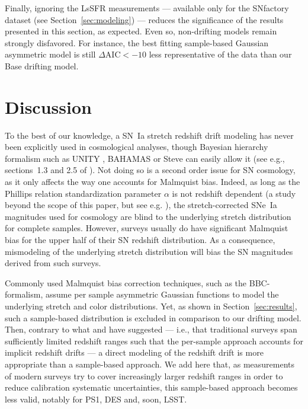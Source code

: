 \documentclass[]{aa}
\begin{document}
Finally, ignoring the LsSFR measurements --- available only for the SNfactory
dataset (see Section~\ref{sec:modeling}) --- reduces the significance of the
results presented in this section, as expected. Even so, non-drifting
models remain strongly disfavored. For instance, the best
fitting sample-based Gaussian asymmetric model is still
$\Delta\mathrm{AIC}<-10$ less representative of the data than our Base drifting
model.

\section{Discussion}\label{sec:discussion}

To the best of our knowledge, a SN~Ia stretch redshift drift modeling has never
been explicitly used in cosmological analyses, though Bayesian hierarchy
formalism such as UNITY \citep{rubin2015}, BAHAMAS \citep{shariff2016} or Steve
\citep{hinton2019} can easily allow it (see e.g., sections~1.3 and 2.5 of
\cite{rubin2015}). Not doing so is a second order issue for SN cosmology, as it
only affects the way one accounts for Malmquist bias. Indeed, as long as the
Phillips relation \citep{phillips1993} standardization parameter $\alpha$ is not
redshift dependent (a study beyond the scope of this paper, but see
e.g. \citealt{scolnic2018a}), the stretch-corrected SNe~Ia magnitudes used for
cosmology are blind to the underlying stretch distribution for complete samples.
However, surveys usually do have significant Malmquist bias for the upper half
of their SN redshift distribution. As a consequence, mismodeling of the
underlying stretch distribution will bias the SN magnitudes derived from such
surveys. 

Commonly used Malmquist bias correction techniques, such as the BBC-formalism,
assume per sample asymmetric Gaussian functions to model the underlying
stretch and color distributions. Yet, as shown in Section~\ref{sec:results},
such a sample-based distribution is excluded in comparison to our
drifting model. Then, contrary to what \citet[][Section~2]{scolnic2016}
and \citet[][Section~5.4]{scolnic2018a} have suggested --- i.e., that
traditional surveys span sufficiently limited redshift ranges
such that the per-sample approach accounts for implicit redshift drifts
--- a direct modeling of the redshift drift is more appropriate than a
sample-based approach. We add here that, as measurements of modern
surveys try to cover increasingly larger redshift ranges in order to reduce
calibration systematic uncertainties, this sample-based approach
becomes less valid, notably for PS1, DES and, soon, LSST.
\end{document}
